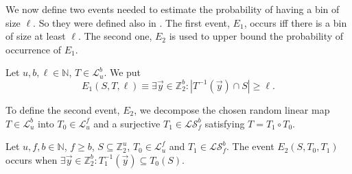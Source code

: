 \documentclass[unicode,review]{siamart1116}
\newcommand{\vecspace}[2]{\mathbb{Z}_{#1}^{#2}}
\newcommand{\binvecspace}[1]{\vecspace{2}{#1}}
\newcommand{\linearmaps}[2]{\mathcal{L}_{#1}^{#2}}
\newcommand{\surjectivelinearmaps}[2]{\mathcal{LS}_{#1}^{#2}}
\numberwithin{theorem}{section}
\begin{document}
We now define two events needed to estimate the probability of having a  bin of size $\ell$. 
So they were defined also in \cite{alonetal}.
The first event, $E_1$, occurs iff there is a bin of size at least $\ell$.
The second one, $E_2$ is used to upper bound the probability of occurrence of $E_1$.
\begin{definition}
Let $u, b, \ell \in \mathbb{N}$, $T \in \linearmaps{u}{b}$. We put \[E_1(S, T, \ell) \equiv \exists \vec{y} \in \binvecspace{b} \colon |T^{-1}(\vec y) \cap S| \geq \ell.\]
\end{definition}

To define the second event, $E_2$, we decompose the chosen random linear map $T \in \linearmaps{u}{b}$ into $T_0 \in \linearmaps{u}{f}$ and a surjective $T_1 \in \surjectivelinearmaps{f}{b}$ satisfying $T = T_1 \circ T_0$.

\begin{definition}
Let $u, f, b \in \mathbb{N}$, $f \geq b$, $S \subseteq \binvecspace{u}$, $T_0 \in \linearmaps{u}{f}$ and $T_1 \in \surjectivelinearmaps{f}{b}$.
The event $E_2(S, T_0, T_1)$ occurs when $\exists \vec{y} \in \binvecspace{b} \colon T_1^{-1}(\vec y) \subseteq T_0(S)$.
\end{definition}
\end{document}
